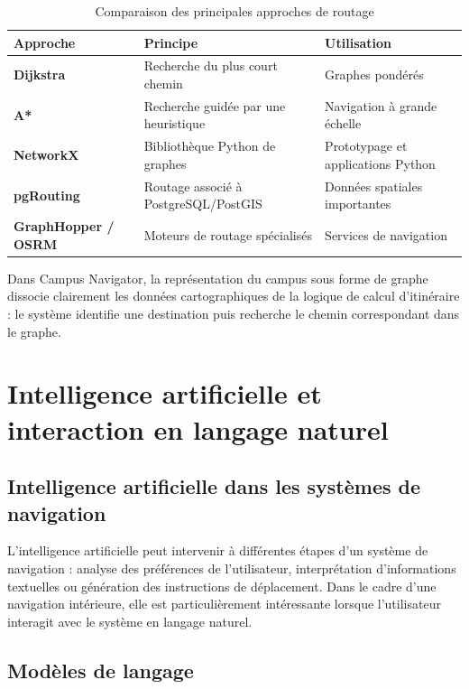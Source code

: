 \documentclass[12pt,a4paper]{report}
\begin{document}
\begin{table}[h]
\centering
\caption{Comparaison des principales approches de routage}
\label{tab:routage}
\small
\begin{tabularx}{\linewidth}{@{}lXX@{}}
\toprule
\textbf{Approche} & \textbf{Principe} & \textbf{Utilisation}\\
\midrule
\textbf{Dijkstra} & Recherche du plus court chemin & Graphes pondérés\\
\textbf{A*} & Recherche guidée par une heuristique & Navigation à grande échelle\\
\textbf{NetworkX} & Bibliothèque Python de graphes & Prototypage et applications Python\\
\textbf{pgRouting} & Routage associé à PostgreSQL/PostGIS & Données spatiales importantes\\
\textbf{GraphHopper / OSRM} & Moteurs de routage spécialisés & Services de navigation\\
\bottomrule
\end{tabularx}
\end{table}

Dans Campus Navigator, la représentation du campus sous forme de graphe dissocie clairement les
données cartographiques de la logique de calcul d'itinéraire : le système identifie une
destination puis recherche le chemin correspondant dans le graphe.

\section{Intelligence artificielle et interaction en langage naturel}

\subsection{Intelligence artificielle dans les systèmes de navigation}

L'intelligence artificielle peut intervenir à différentes étapes d'un système de navigation :
analyse des préférences de l'utilisateur, interprétation d'informations textuelles ou génération
des instructions de déplacement. Dans le cadre d'une navigation intérieure, elle est
particulièrement intéressante lorsque l'utilisateur interagit avec le système en langage naturel.

\subsection{Modèles de langage}
\end{document}
